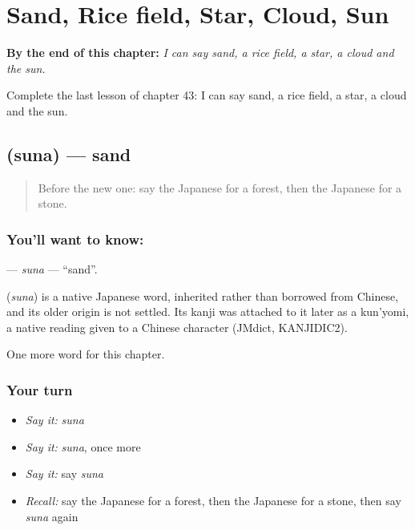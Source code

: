 
\chapter{Sand, Rice field, Star, Cloud, Sun}
\label{ch:ja-sand-rice-field-star-cloud-sun}

\begin{chapteropening}
\textbf{By the end of this chapter:} \emph{I can say sand, a rice field, a star, a cloud and the sun.}

Complete the last lesson of chapter 43: I can say sand, a rice field, a star, a cloud and the sun.
\end{chapteropening}

\section[\texorpdfstring{\ja{すな} (suna)}{すな (suna)}]{ (suna) — sand}

\label{lesson:JA-C43-suna}



\begin{quote}
Before the new one: say the Japanese for a forest, then the Japanese for a stone.
\end{quote}

\subsection*{You'll want to know: }
\textbf{} — \emph{suna} — \textquotedblleft{}sand\textquotedblright{}.

\begin{cousinweb}
\textbf{} (\emph{suna}) is a native Japanese word, inherited rather than borrowed from Chinese, and its older origin is not settled. Its kanji was attached to it later as a kun'yomi, a native reading given to a Chinese character (JMdict, KANJIDIC2).
\end{cousinweb}

\begin{grammarlens}[title={What you've built}]
One more word for this chapter.
\end{grammarlens}

\subsection*{Your turn}
\begin{itemize}
\raggedright
  \item \emph{Say it:} \emph{suna}
  \item \emph{Say it:} \emph{suna}, once more
  \item \emph{Say it:} say \emph{suna}
  \item \emph{Recall:} say the Japanese for a forest, then the Japanese for a stone, then say \emph{suna} again
\end{itemize}

